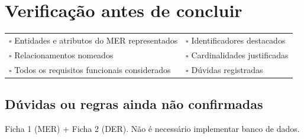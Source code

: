 \section{Verificação antes de concluir}

\begin{tcolorbox}[colback=accent!5, colframe=accent, boxrule=0.6pt, sharp corners]
\begin{tabularx}{\linewidth}{X X}
$\square$ Entidades e atributos do MER representados &
$\square$ Identificadores destacados \\
$\square$ Relacionamentos nomeados &
$\square$ Cardinalidades justificadas \\
$\square$ Todos os requisitos funcionais considerados &
$\square$ Dúvidas registradas \\
\end{tabularx}
\end{tcolorbox}

\subsection{Dúvidas ou regras ainda não confirmadas}
\begin{tcolorbox}[colback=white, colframe=gray!70, boxrule=0.6pt, sharp corners, height=9cm]
\end{tcolorbox}

\begin{notebox}
Ficha 1 (MER) + Ficha 2 (DER). Não é necessário implementar banco de dados.
\end{notebox}

